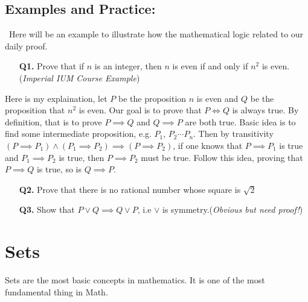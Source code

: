 \documentclass{article}
\begin{document}
\subsection{Examples and Practice:}
\quad\ Here will be an example to illustrate how the mathematical logic related to our daily proof.
\begin{itemize}
    \item[\textbf{Q1.}] Prove that if $n$ is an integer, then $n$ is even if and only if $n^2$ is even.(\textit{Imperial IUM Course Example})
\end{itemize}
Here is my explaination, let $P$ be the proposition $n$ is even and $Q$ be the proposition that
$n^2$ is even. Our goal is to prove that $P \iff Q$ is always true. By definition, that is to prove
$P \implies Q$ and $Q \implies P$ are both true. Basic idea is to find some intermediate proposition,
e.g. $P_1$, $P_2 \cdots P_n$. Then by transitivity $(P\implies P_1) \land (P_1 \implies P_2) \implies (P \implies P_2)$,
if one knows that $P \implies P_1$ is true and $P_1 \implies P_2$ is true, then $P \implies P_2$ must be
true. Follow this idea, proving that $P \implies Q$ is true, so is $Q \implies P$.
\begin{itemize}
    \item[\textbf{Q2.}] Prove that there is no rational number whose square is $\sqrt{2}$
    \item[\textbf{Q3.}] Show that $P\lor Q \implies Q \lor P$, i.e $\lor$ is symmetry.(\textit{Obvious but need proof!})
\end{itemize}
\newpage
\section{Sets}
Sets are the most basic concepts in mathematics. It is one of the most fundamental thing in Math.
\end{document}
